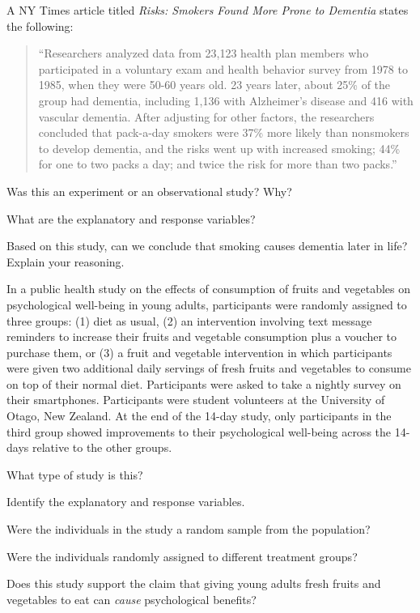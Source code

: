 \documentclass[12pt]{exam}
\newcounter{countA}
\begin{document}
\begin{questions}
\setcounter{question}{\value{countA}}
\item A NY Times article titled \emph{Risks: Smokers Found More Prone to Dementia} states the following:

\begin{quote}
``Researchers analyzed data from 23,123 health plan members who
participated in a voluntary exam and health behavior survey from 1978 to
1985, when they were 50-60 years old. 23 years later, about 25\% of the
group had dementia, including 1,136 with Alzheimer's disease and 416
with vascular dementia. After adjusting for other factors, the
researchers concluded that pack-a-day smokers were 37\% more likely than
nonsmokers to develop dementia, and the risks went up with increased
smoking; 44\% for one to two packs a day; and twice the risk for more
than two packs.''
\end{quote}

\begin{parts}
\item
  Was this an experiment or an observational study? Why?
\vfill
\item
  What are the explanatory and response variables?
\vfill
\item
  Based on this study, can we conclude that smoking causes dementia
  later in life? Explain your reasoning.
\vfill
\end{parts}


\question
  In a public health study on the effects of consumption of fruits and
  vegetables on psychological well-being in young adults, participants
  were randomly assigned to three groups: (1) diet as usual, (2) an
  intervention involving text message reminders to increase their fruits
  and vegetable consumption plus a voucher to purchase them, or (3) a
  fruit and vegetable intervention in which participants were given two
  additional daily servings of fresh fruits and vegetables to consume on
  top of their normal diet. Participants were asked to take a nightly
  survey on their smartphones. Participants were student volunteers at
  the University of Otago, New Zealand. At the end of the 14-day study,
  only participants in the third group showed improvements to their
  psychological well-being across the 14-days relative to the other
  groups.

\begin{parts}
\item
  What type of study is this?
\vfill
\item
  Identify the explanatory and response variables.
\vfill

\newpage
\item
  Were the individuals in the study a random sample from the
  population?
\vfill
\item
  Were the individuals randomly assigned to different treatment
  groups?
\vfill
\item
  Does this study support the claim that giving young adults fresh
  fruits and vegetables to eat can \emph{cause} psychological benefits?
\end{parts}
\setcounter{countA}{\value{question}}
\end{questions}
\end{document}
